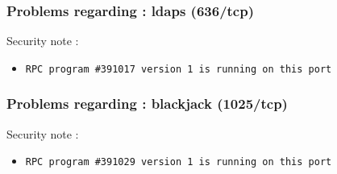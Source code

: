 \documentclass{article}
\begin{document}
\subsubsection{Problems regarding : ldaps (636/tcp)}
Security note :\\
\begin{itemize}
\item \begin{verbatim}
RPC program #391017 version 1 is running on this port
\end{verbatim}\end{itemize}
\subsubsection{Problems regarding : blackjack (1025/tcp)}
Security note :\\
\begin{itemize}
\item \begin{verbatim}
RPC program #391029 version 1 is running on this port
\end{verbatim}\end{itemize}
\end{document}
